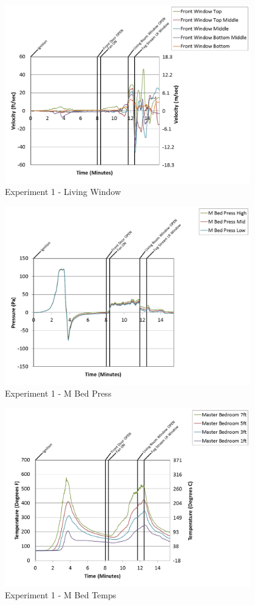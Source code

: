 \documentclass{article}
\begin{document}
\begin{appendices}
\begin{figure}[h!]
	\centering
	\includegraphics[height=3.05in]{0_Images/Results_Charts/Exp_1_Charts/LivingWindow.png}
	\caption{Experiment 1 - Living Window}
\end{figure}

\clearpage

\begin{figure}[h!]
	\centering
	\includegraphics[height=3.05in]{0_Images/Results_Charts/Exp_1_Charts/MBedPress.png}
	\caption{Experiment 1 - M Bed Press}
\end{figure}


\begin{figure}[h!]
	\centering
	\includegraphics[height=3.05in]{0_Images/Results_Charts/Exp_1_Charts/MBedTemps.png}
	\caption{Experiment 1 - M Bed Temps}
\end{figure}


\end{appendices}
\end{document}
